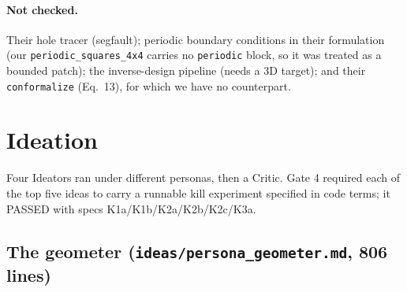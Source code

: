 \documentclass[10pt,a4paper]{article}
\newcommand{\fn}[1]{\nolinkurl{#1}}
\begin{document}
\paragraph{Not checked.} Their hole tracer (segfault); periodic boundary conditions in their
formulation (our \fn{periodic_squares_4x4} carries no \texttt{periodic} block, so it was treated
as a bounded patch); the inverse-design pipeline (needs a 3D target); and their
\texttt{conformalize} (Eq.~13), for which we have no counterpart.

\section{Ideation}

Four Ideators ran under different personas, then a Critic. Gate 4 required each of the top five
ideas to carry a runnable kill experiment specified in code terms; it PASSED with specs
K1a/K1b/K2a/K2b/K2c/K3a.

\subsection{The geometer (\texttt{ideas/persona\_geometer.md}, 806 lines)}
\end{document}
